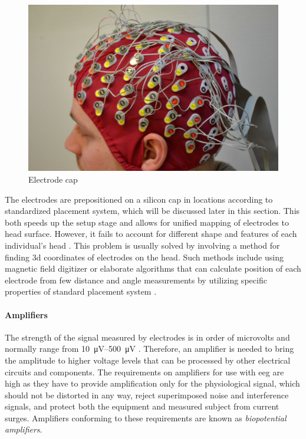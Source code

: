 \begin{figure}[htb]
	\centering
	\includegraphics[width=1\linewidth]{fig/eegCap.jpg}
	\caption[Caption for LOF]{Electrode cap\protect\footnotemark}
	\label{fig:eegCap}
\end{figure}

The electrodes are prepositioned on a silicon cap in locations according to
standardized placement system, which will be discussed later in this section.
This both speeds up the setup stage and allows for unified mapping of electrodes
to head surface. However, it fails to account for different shape and features of each
individual's head \cite{eegFund}. This problem is usually solved by involving a
method for finding \gls{3d} coordinates of electrodes on the head. Such methods
include using magnetic field digitizer or elaborate algorithms that can
calculate position of each electrode from few distance and angle measurements by
utilizing specific properties of standard placement system \cite{rapidPos}.

\paragraph{Amplifiers}
The strength of the signal measured by electrodes is in order of microvolts and
normally range from \SIrange{10}{500}{\uV} \cite{neuralAmp}. Therefore, an amplifier is needed to bring the amplitude to higher voltage levels that can be processed
by other electrical circuits and components. The requirements on amplifiers for
use with \gls{eeg} are high as they have to provide amplification only for the physiological
signal, which should not be distorted in any way, reject superimposed noise and
interference signals, and protect both the equipment and measured subject from
current surges. Amplifiers conforming to these requirements are known as
\emph{biopotential amplifiers}. \cite{biopotAmp}

